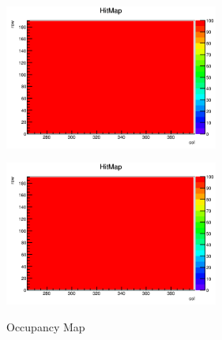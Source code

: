 \begin{figure}[h]
  \centering
  \begin{minipage}[b]{0.45\linewidth}
    \centering
    \includegraphics[width=7cm]{./figure/DigitalScan.png}
    \label{fig:bfnoise}
  \end{minipage}
  \begin{minipage}[b]{0.45\linewidth}
    \centering
    \includegraphics[width=7cm]{./figure/DigitalScan.png}
    \label{fig:afnoise}
  \end{minipage}
  \caption{Occupancy Map}
\end{figure}

